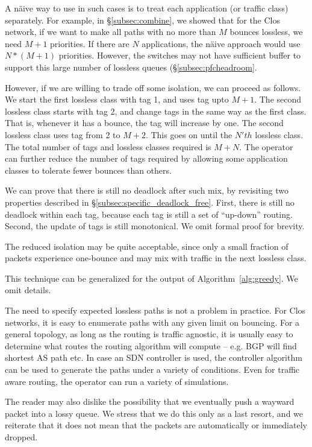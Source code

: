 A n{\"a}ive way to use \sysname{} in such cases is to treat each application (or
traffic class) separately.  For example, in \S\ref{subsec:combine}, we showed
that for the Clos network, if we want to make  all paths with no more than $M$
bounces lossless, we need $M+1$ priorities. If there are $N$ applications, the
n{\"a}ive approach would use $N*(M+1)$ priorities.  However, the switches may
not have sufficient buffer to support this large number of lossless queues
(\S\ref{subsec:pfcheadroom}.

However, if we are willing to trade off some isolation, we can proceed as
follows.  We start the first lossless class with tag 1, and uses tag upto $M+1$.
The second lossless class starts with tag 2, and change tags in the same way as
the first class.  That is, whenever it has a bounce, the tag will increase by
one. The second lossless class uses tag from 2 to $M+2$. This goes on until the
$N'th$ lossless class. The total number of tags and lossless classes required is
$M + N$. The operator can further reduce the number of tags required by allowing
some application classes to tolerate fewer bounces than others.

We can prove that there is still no deadlock after such mix, by revisiting two
properties described in \S\ref{subsec:specific_deadlock_free}. First, there is
still no deadlock within each tag, because each tag is still a set of
``up-down'' routing. Second, the update of tags is still monotonical. We omit
formal proof for brevity. 

The reduced isolation may be quite acceptable, since only a small
fraction of packets experience one-bounce and may mix with traffic in the next
lossless class. 

This technique can be generalized for the output of Algorithm~\ref{alg:greedy}.
We omit details.

 The need to specify expected
lossless paths is not a problem in practice. For Clos networks, it is easy to
enumerate paths with any given limit on bouncing. For a general topology, as long
as the routing is traffic agnostic, it is usually easy to determine what routes
the routing algorithm will compute -- e.g. BGP will find shortest AS path etc.
In case an SDN controller is used, the controller algorithm can be used to
generate the paths under a variety of conditions. Even for traffic aware
routing, the operator can run a variety of simulations. 

The reader may also dislike the possibility that we eventually push a wayward
packet into a lossy queue. We stress that we do this only as a last resort, and
we reiterate that it does not mean that the packets are automatically or
immediately dropped. 
